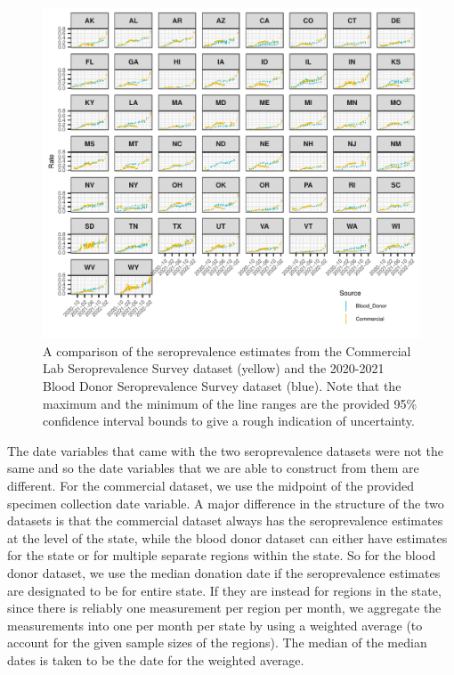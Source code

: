 \documentclass{article}
\begin{document}
\begin{figure}[!tb]
\centering
    \includegraphics[width=.99\textwidth]{sero_blood_comm_compar.pdf}
    \caption{A comparison of the seroprevalence estimates from the Commercial
    Lab Seroprevalence Survey dataset (yellow) and the 2020-2021 Blood Donor 
    Seroprevalence Survey dataset (blue). Note that the maximum and the minimum
    of the line ranges are the provided 95\% confidence interval bounds to 
    give a rough indication of uncertainty.}
    \label{fig:sero_blood_comm_compar}
\end{figure}

The date variables that came with the two seroprevalence datasets were not the
same and so the date variables that we are able to construct from them are
different. For the commercial dataset, we use the midpoint of the provided
specimen collection date variable. A major difference in the structure of the
two datasets is that the commercial dataset always has the seroprevalence
estimates at the level of the state, while the blood donor dataset can either have 
estimates for the state or for multiple separate regions within the state. So for the 
blood donor dataset, we use the median donation date if the seroprevalence 
estimates are designated to be for entire state. If they are instead for regions in 
the state, since there is reliably one measurement per region per month, we 
aggregate the measurements into one per month per state by using a weighted 
average (to account for the given sample sizes of the regions). The median of the 
median dates is taken to be the date for the weighted average.
\end{document}
